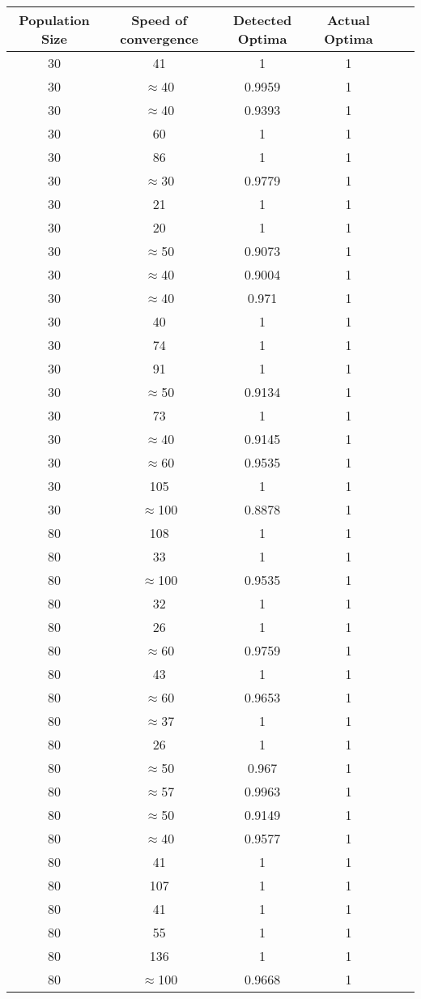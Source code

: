 \documentclass[12pt]{article}
\begin{document}
\begin{table}[h!]
\centering
\begin{tabular}{|c|c|c|c|c|c|}
\textbf{Population Size} & Speed of convergence & Detected Optima & Actual Optima \\ \hline
\hline
30 & 41 & 1 & 1 \\ \hline
30 & $\approx$40 & 0.9959 & 1 \\ \hline
30 & $\approx$40 & 0.9393 & 1 \\ \hline
30 & 60 & 1 & 1 \\ \hline
30 & 86 & 1 & 1 \\ \hline
30 & $\approx$30 & 0.9779 & 1 \\ \hline
30 & 21 & 1 & 1 \\ \hline
30 & 20 & 1 & 1 \\ \hline
30 & $\approx$50 & 0.9073 & 1 \\ \hline
30 & $\approx$40 & 0.9004 & 1 \\ \hline
30 & $\approx$40 & 0.971 & 1 \\ \hline
30 & 40 & 1 & 1 \\ \hline
30 & 74 & 1 & 1 \\ \hline
30 & 91 & 1 & 1 \\ \hline
30 & $\approx$50 & 0.9134 & 1 \\ \hline
30 & 73 & 1 & 1 \\ \hline
30 & $\approx$40 & 0.9145 & 1 \\ \hline
30 & $\approx$60 & 0.9535 & 1 \\ \hline
30 & 105 & 1 & 1 \\ \hline
30 & $\approx$100 & 0.8878 & 1 \\ \hline
80 & 108 & 1 & 1 \\ \hline
80 & 33 & 1 & 1 \\ \hline
80 & $\approx$100 & 0.9535 & 1 \\ \hline
80 & 32 & 1 & 1 \\ \hline
80 & 26 & 1 & 1 \\ \hline
80 & $\approx$60 & 0.9759 & 1 \\ \hline
80 & 43 & 1 & 1 \\ \hline
80 & $\approx$60 & 0.9653 & 1 \\ \hline
80 & $\approx$37 & 1 & 1 \\ \hline
80 & 26 & 1 & 1 \\ \hline
80 & $\approx$50 & 0.967 & 1 \\ \hline
80 & $\approx$57 & 0.9963 & 1 \\ \hline
80 & $\approx$50 & 0.9149 & 1 \\ \hline
80 & $\approx$40 & 0.9577 & 1 \\ \hline
80 & 41 & 1 & 1 \\ \hline
80 & 107 & 1 & 1 \\ \hline
80 & 41 & 1 & 1 \\ \hline
80 & 55 & 1 & 1 \\ \hline
80 & 136 & 1 & 1 \\ \hline
80 & $\approx$100 & 0.9668 & 1 \\ \hline
\end{tabular}
\end{table}
\end{document}
